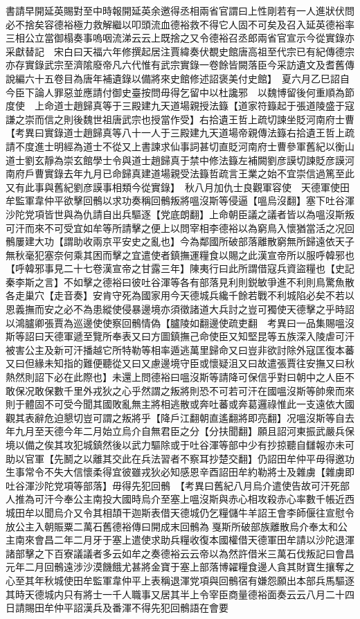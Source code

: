 書請早開延英賜對至中時報開延英余邀得丞相兩省官謂曰上性剛若有一人進狀伏問必不捨矣容德裕極力救解繼以叩頭流血德裕救不得它人固不可矣及召入延英德裕率三相公立當御榻奏事嗚咽流涕云云上既捨之又令德裕召丞郎兩省官宣示今從實錄亦采獻替記　宋白曰天福六年修撰起居注賈緯奏伏覩史館唐高祖至代宗已有紀傳德宗亦存實錄武宗至濟隂廢帝凡六代惟有武宗實錄一卷餘皆闕落臣今采訪遺文及耆舊傳說編六十五卷目為唐年補遺錄以備將來史館修述詔褒美付史館】　夏六月乙巳詔自今臣下論人罪惡並應請付御史臺按問毋得乞留中以杜讒邪　以魏博留後何重順為節度使　上命道士趙歸真等于三殿建九天道場親授法籙【道家符籙起于張道陵盛于寇謙之崇而信之則後魏世祖唐武宗也授當作受】右拾遺王哲上疏切諫坐貶河南府士曹【考異曰實錄道士趙歸真等八十一人于三殿建九天道場帝親傳法籙右拾遺王哲上疏請不度進士明經為道士不從又上書諫求仙事詞甚切直貶河南府士曹參軍舊紀以衡山道士劉玄靜為崇玄館學士令與道士趙歸真于禁中修法籙左補闕劉彦謨切諫貶彦謨河南府戶曹實錄去年九月已命歸真建道場親受法籙哲疏言王業之始不宜崇信過篤至此又有此事與舊紀劉彦謨事相類今從實錄】　秋八月加仇士良觀軍容使　天德軍使田牟監軍韋仲平欲擊回鶻以求功奏稱回鶻叛將嗢沒斯等侵逼【嗢烏沒翻】塞下吐谷渾沙陀党項皆世與為仇請自出兵驅逐【党底朗翻】上命朝臣議之議者皆以為嗢沒斯叛可汗而來不可受宜如牟等所請擊之便上以問宰相李德裕以為窮鳥入懷猶當活之况回鶻屢建大功【謂助收兩京平安史之亂也】今為鄰國所破部落離散窮無所歸遠依天子無秋毫犯塞奈何乘其困而擊之宜遣使者鎮撫運糧食以賜之此漢宣帝所以服呼韓邪也【呼韓邪事見二十七卷漢宣帝之甘露三年】陳夷行曰此所謂借寇兵資盜糧也【史記秦李斯之言】不如擊之德裕曰彼吐谷渾等各有部落見利則鋭敏爭進不利則鳥驚魚散各走巢穴【走音奏】安肯守死為國家用今天德城兵纔千餘若戰不利城陷必矣不若以恩義撫而安之必不為患縱使侵暴邊境亦須徵諸道大兵討之豈可獨使天德擊之乎時詔以鴻臚卿張賈為巡邊使使察回鶻情偽【臚陵如翻邊使疏吏翻　考異曰一品集賜嗢沒斯等詔曰天德軍遞至覽所奉表又曰方圖鎮撫己命使臣又知堅昆等五族深入陵虐可汗被害公主及新可汗播越它所特勒等相率遁逃萬里歸命又曰豈非欲討除外寇匡復本蕃又曰但緣未知指的難便聽從又曰又慮邊境守臣或懷疑沮又曰故遣張賈往安撫又曰秋熱然則詔下必在此際也】未還上問德裕曰嗢沒斯等請降可保信乎對曰朝中之人臣不敢保况敢保數千里外戎狄之心乎然謂之叛將則恐不可若可汗在國嗢沒斯等帥衆而來則于體固不可受今聞其國敗亂無主將相逃散或奔吐蕃或奔葛邏祿惟此一支遠依大國觀其表辭危迫懇切豈可謂之叛將乎【降戶江翻朝直遙翻將即亮翻】况嗢沒斯等自去年九月至天德今年二月始立烏介自無君臣之分【分扶聞翻】願且詔河東振武嚴兵保境以備之俟其攻犯城鎮然後以武力驅除或于吐谷渾等部中少有抄掠聽自讎報亦未可助以官軍【先鬭之以離其交此在兵法習者不察耳抄楚交翻】仍詔田牟仲平毋得邀功生事常令不失大信懷柔得宜彼雖戎狄必知感恩辛酉詔田牟約勒將士及雜虜【雜虜即吐谷渾沙陀党項等部落】毋得先犯回鶻　【考異曰舊紀八月烏介遣使告故可汗死部人推為可汗今奉公主南投大國時烏介至塞上嗢沒斯與赤心相攻殺赤心率數千帳近西城田牟以聞烏介又令其相頡干迦斯表借天德城仍乞糧儲牛羊詔王會李師偃往宣慰令放公主入朝賑粟二萬石舊德裕傳曰開成末回鶻為戛斯所破部族離散烏介奉太和公主南來會昌二年二月牙于塞上遣使求助兵糧收復本國權借天德軍田牟請以沙陀退渾諸部擊之下百寮議議者多云如牟之奏德裕云云帝以為然許借米三萬石伐叛記曰會昌元年二月回鶻遠涉沙漠饑餓尤甚將金寶于塞上部落博糴糧食邊人貪其財寶生攘奪之心至其年秋城使田牟監軍韋仲平上表稱退渾党項與回鶻宿有嫌怨願出本部兵馬驅逐其時天德城内只有將士一千人職事又居其半上令宰臣商量德裕面奏云云八月二十四日請賜田牟仲平詔漢兵及番渾不得先犯回鶻語在會要